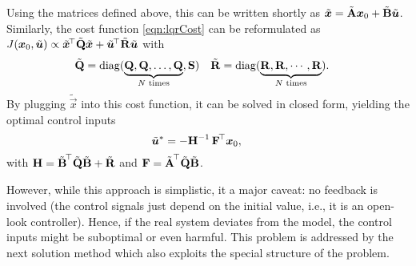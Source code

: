 			Using the matrices defined above, this can be written shortly as \( \tilde{\bm{x}} = \tilde{\bm{\mathrm{A}}} \bm{x}_0 + \tilde{\bm{\mathrm{B}}} \tilde{\bm{u}} \). Similarly, the cost function \eqref{eqn:lqrCost} can be reformulated as \( J(\bm{x}_0, \tilde{\bm{u}}) \propto \tilde{\bm{x}}^{\!\top} \tilde{\bm{\mathrm{Q}}} \tilde{\bm{x}} + \tilde{\bm{u}}^{\!\top} \tilde{\bm{\mathrm{R}}} \tilde{\bm{u}} \) with
			\begin{align}
				\tilde{\bm{\mathrm{Q}}} &= \operatorname{diag}(\underbrace{\bm{\mathrm{Q}}, \bm{\mathrm{Q}}, \dots, \bm{\mathrm{Q}}}_{N\text{ times}}, \bm{\mathrm{S}}) &
				\tilde{\bm{\mathrm{R}}} &= \operatorname{diag}(\underbrace{\bm{\mathrm{R}}, \bm{\mathrm{R}}, \cdots, \bm{\mathrm{R}}}_{N\text{ times}}).
			\end{align}
			By plugging \(\tilde{\vec{x}}\) into this cost function, it can be solved in closed form, yielding the optimal control inputs
			\begin{equation}
				\tilde{\bm{u}}^\ast = -\bm{\mathrm{H}}^{-1}\, \bm{\mathrm{F}}^{\!\top} \bm{x}_0,\qquad
			\end{equation}
			with \( \bm{\mathrm{H}} = \tilde{\bm{\mathrm{B}}}^{\!\top} \tilde{\bm{\mathrm{Q}}} \tilde{\bm{\mathrm{B}}} + \tilde{\bm{\mathrm{R}}} \) and \( \bm{\mathrm{F}} = \tilde{\bm{\mathrm{A}}}^{\!\top} \tilde{\bm{\mathrm{Q}}} \tilde{\bm{\mathrm{B}}} \).

			However, while this approach is simplistic, it a major caveat: no feedback is involved (the control signals just depend on the initial value, i.e., it is an open-look controller). Hence, if the real system deviates from the model, the control inputs might be suboptimal or even harmful. This problem is addressed by the next solution method which also exploits the special structure of the problem.

